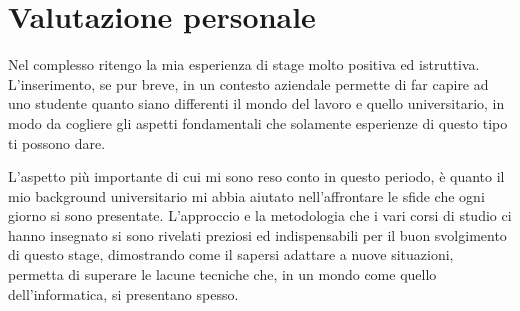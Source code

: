 \section{Valutazione personale}
Nel complesso ritengo la mia esperienza di stage molto positiva ed istruttiva. L'inserimento, se pur breve, in un contesto aziendale permette di far capire ad uno studente quanto siano differenti il mondo del lavoro e quello universitario, in modo da cogliere gli aspetti fondamentali che solamente esperienze di questo tipo ti possono dare.


L'aspetto più importante di cui mi sono reso conto in questo periodo, è quanto il mio background universitario mi abbia aiutato nell'affrontare le sfide che ogni giorno si sono presentate. L'approccio e la metodologia che i vari corsi di studio ci hanno insegnato si sono rivelati preziosi ed indispensabili per il buon svolgimento di questo stage, dimostrando come il sapersi adattare a nuove situazioni, permetta di superare le lacune tecniche che, in un mondo come quello dell'informatica, si presentano spesso. 